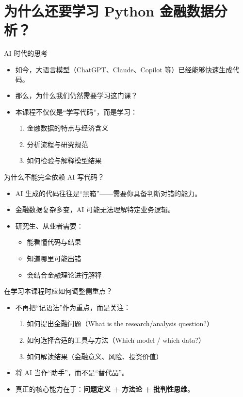 \documentclass[9pt]{ctexbeamer}
\begin{document}
\section{为什么还要学习 Python 金融数据分析？}

\begin{frame}{AI 时代的思考}
  \begin{itemize}
    \item 如今，大语言模型（ChatGPT、Claude、Copilot 等）已经能够快速生成代码。
    \item 那么，为什么我们仍然需要学习这门课？
    \item 本课程不仅仅是“学写代码”，而是学习：
    \begin{enumerate}
      \item 金融数据的特点与经济含义
      \item 分析流程与研究规范
      \item 如何检验与解释模型结果
    \end{enumerate}
  \end{itemize}
\end{frame}

\begin{frame}{为什么不能完全依赖 AI 写代码？}
  \begin{itemize}
    \item AI 生成的代码往往是“黑箱”——需要你具备判断对错的能力。
    \item 金融数据复杂多变，AI 可能无法理解特定业务逻辑。
    \item 研究生、从业者需要：
    \begin{itemize}
      \item 能看懂代码与结果
      \item 知道哪里可能出错
      \item 会结合金融理论进行解释
    \end{itemize}
  \end{itemize}
\end{frame}

\begin{frame}{在学习本课程时应如何调整侧重点？}
  \begin{itemize}
    \item 不再把“记语法”作为重点，而是关注：
    \begin{enumerate}
      \item 如何提出金融问题（What is the research/analysis question?）
      \item 如何选择合适的工具与方法（Which model / which data?）
      \item 如何解读结果（金融意义、风险、投资价值）
    \end{enumerate}
    \item 将 AI 当作“助手”，而不是“替代品”。
    \item 真正的核心能力在于：\textbf{问题定义 + 方法论 + 批判性思维}。
  \end{itemize}
\end{frame}
\end{document}
